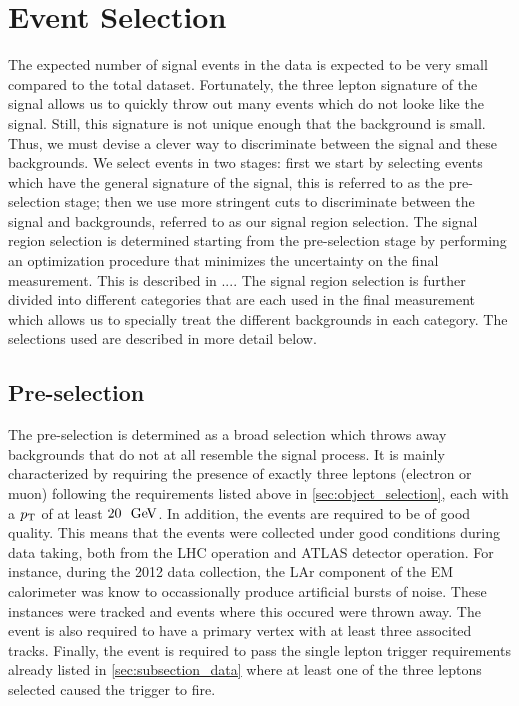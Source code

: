 \section{Event Selection}
\label{sec:event_selection}

The expected number of signal events in the data is expected
to be very small compared to the total dataset. %
Fortunately, the three lepton signature of the signal allows us to
quickly throw out many events which do not looke like the signal.
Still, this signature is not unique enough that the background
is small. Thus, we must devise a clever way to discriminate 
between the signal and these backgrounds. We select
events in two stages: first we start
by selecting events which have the general signature of the signal, 
this is referred to as the pre-selection stage; then we 
use more stringent cuts to discriminate between the signal and backgrounds, 
referred to as our signal region selection.
The signal region selection is determined starting from the pre-selection
stage by performing an optimization procedure that minimizes the uncertainty
on the final measurement.  This is described in \sec....
The signal region selection is further divided into different
categories that are each used in the final measurement
which allows us to specially treat the different backgrounds
in each category.  
The selections used are described in more detail below.




\subsection{Pre-selection}
\label{sec:preselection}

The pre-selection is determined as a broad selection which throws
away backgrounds that do not at all resemble the signal process.
It is mainly characterized by requiring the presence of exactly three leptons
(electron or muon) following the requirements listed above in 
\sec\ref{sec:object_selection}, each with a $p_{\mathrm{T}}$ of at least $20~\GeV$.
In addition, the events are required to be of good quality. This means
that the events were collected under good conditions during data taking,
both from the LHC operation and ATLAS detector operation. For instance,
during the 2012 data collection, the LAr component of the EM calorimeter
was know to occassionally produce artificial bursts of noise. These instances
were tracked and events where this occured were thrown away. The event is 
also required to have a primary vertex with at least three associted tracks.
Finally, the event is required to pass the single lepton trigger
requirements already listed in \sec\ref{sec:subsection_data} where 
at least one of the three leptons selected caused the trigger to fire.

